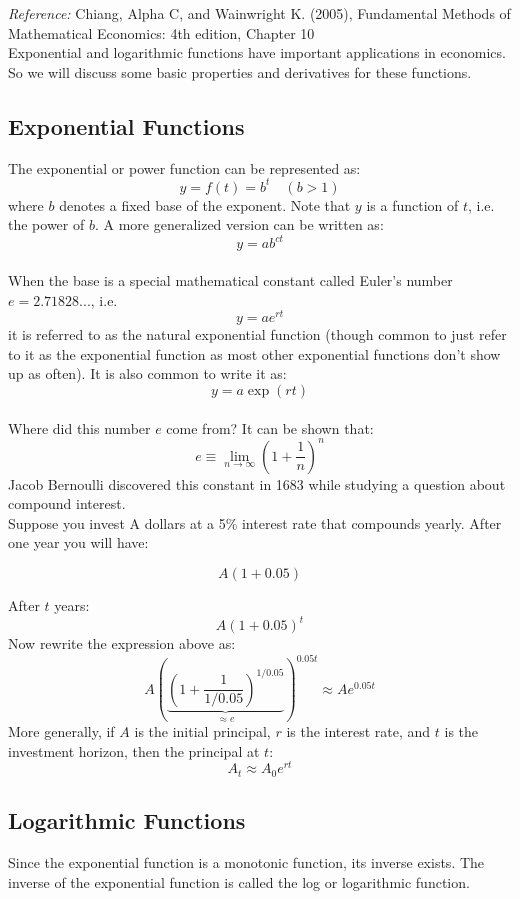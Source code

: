\documentclass{./../Latex/handout}
\begin{document}
\thispagestyle{plain}


\textit{Reference:} Chiang, Alpha C, and Wainwright K. (2005), Fundamental Methods of Mathematical Economics: 4th edition, Chapter 10 \\

Exponential and logarithmic functions have important applications in economics. So we will discuss some basic properties and derivatives for these functions.

\subsection*{Exponential Functions}
The exponential or power function can be represented as:
$$
y=f(t)=b^{t} \quad(b>1)
$$
where $b$ denotes a fixed base of the exponent. Note that $y$ is a function of $t$, i.e. the power of $b$. A more generalized version can be written as:
$$
y=a b^{c t}
$$ \\
When the base is a special mathematical constant called Euler's number $e=2.71828...$, i.e.
$$
y=a e^{r t}
$$
it is referred to as the natural exponential function (though common to just refer to it as the exponential function as most other exponential functions don't show up as often). It is also common to write it as:
$$
y=a \exp (r t)
$$ 
\\
Where did this number $e$ come from? It can be shown that:
$$
e \equiv \lim _{n \rightarrow \infty}\left(1+\frac{1}{n}\right)^{n}
$$
Jacob Bernoulli discovered this constant in 1683 while studying a question about compound interest. \\

Suppose you invest A dollars at a 5\% interest rate that compounds yearly. After one year you will have:

\[ A \left(1+0.05\right)  \] 

After $t$ years:
\[ A \left(1+0.05\right)^{t} \]
Now rewrite the expression above as:
\[ A\left( \underbrace{\left(1+\frac{1}{1/0.05}\right)^{1/0.05}}_{\approx e} \right)^{0.05t} \approx A e^{0.05t}  \]
More generally, if $A$ is the initial principal, $r$ is the interest rate, and $t$ is the investment horizon, then the principal at $t$:
$$ A_t \approx A_0 e^{rt} $$

\subsection*{Logarithmic Functions}
Since the exponential function is a monotonic function, its inverse exists. The inverse of the exponential function is called the log or logarithmic function.\\
\end{document}
